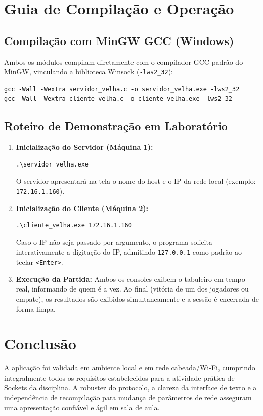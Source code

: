 \documentclass[a4paper,12pt]{article}
\begin{document}
\section{Guia de Compilação e Operação}

\subsection{Compilação com MinGW GCC (Windows)}
Ambos os módulos compilam diretamente com o compilador GCC padrão do MinGW, vinculando a biblioteca Winsock (\texttt{-lws2\_32}):
\begin{lstlisting}[style=terminal]
gcc -Wall -Wextra servidor_velha.c -o servidor_velha.exe -lws2_32
gcc -Wall -Wextra cliente_velha.c -o cliente_velha.exe -lws2_32
\end{lstlisting}

\subsection{Roteiro de Demonstração em Laboratório}
\begin{enumerate}
    \item \textbf{Inicialização do Servidor (Máquina 1):}
    \begin{lstlisting}[style=terminal]
.\servidor_velha.exe
    \end{lstlisting}
    O servidor apresentará na tela o nome do host e o IP da rede local (exemplo: \texttt{172.16.1.160}).
    
    \item \textbf{Inicialização do Cliente (Máquina 2):}
    \begin{lstlisting}[style=terminal]
.\cliente_velha.exe 172.16.1.160
    \end{lstlisting}
    Caso o IP não seja passado por argumento, o programa solicita interativamente a digitação do IP, admitindo \texttt{127.0.0.1} como padrão ao teclar \texttt{<Enter>}.
    
    \item \textbf{Execução da Partida:}
    Ambos os consoles exibem o tabuleiro em tempo real, informando de quem é a vez. Ao final (vitória de um dos jogadores ou empate), os resultados são exibidos simultaneamente e a sessão é encerrada de forma limpa.
\end{enumerate}

\section{Conclusão}
A aplicação foi validada em ambiente local e em rede cabeada/Wi-Fi, cumprindo integralmente todos os requisitos estabelecidos para a atividade prática de Sockets da disciplina. A robustez do protocolo, a clareza da interface de texto e a independência de recompilação para mudança de parâmetros de rede asseguram uma apresentação confiável e ágil em sala de aula.
\end{document}
